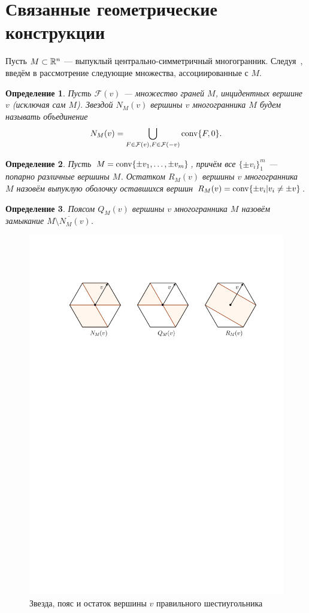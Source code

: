 \documentclass[a4paper,12pt]{article}
\def\co{\mathop{\rm conv}}
\newtheorem*{defin*}{Определение}
\numberwithin{equation}{section}
\begin{document}
	\section{Связанные геометрические конструкции}
	Пусть $M\subset\mathbb {R}^n$ --- выпуклый центрально-симметричный многогранник. Следуя~\cite{crospol}, введём в рассмотрение следующие множества, ассоциированные с $M$.
	\begin{defin*}
		Пусть $\mathcal{F}(v)$ --- множество граней $M$, инцидентных вершине $v$ (исключая сам $M$). \textit{Звездой $N_M(v)$ вершины $v$ многогранника $M$} будем называть объединение
			 $$N_M(v)=\bigcup_{F\in\mathcal{F}(v), F\in\mathcal{F}(-v)} \co\{F,0\}.$$
	\end{defin*}
	\begin{defin*}
		Пусть $M=\co\{\pm v_1,\ldots, \pm v_m\}$, причём все $\{\pm v_i\}_1^m$ --- попарно различные вершины $M$. \textit{Остатком $R_M(v)$ вершины $v$ многогранника $M$} назовём выпуклую оболочку оставшихся вершин $R_M(v)=\co\{\pm v_i| v_i\neq\pm v\}$.
	\end{defin*}
	\begin{defin*}
		\textit{Поясом $Q_M(v)$ вершины $v$ многогранника $M$} назовём замыкание $\overline{M\setminus N_M(v)}$.
	\end{defin*}
	\begin{figure}[h!]
		\begin{center}
			\includegraphics[scale=0.8]{pics/constructions/pic.pdf}
		\end{center}
		\caption{Звезда, пояс и остаток вершины $v$ правильного шестиугольника}
	\end{figure}
\end{document}
